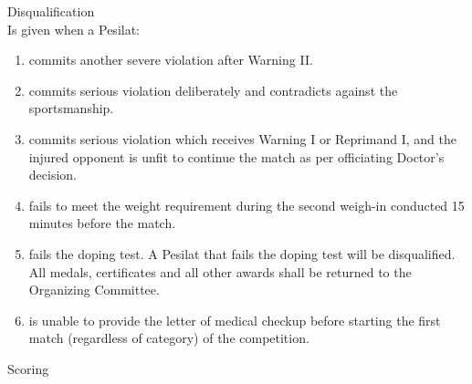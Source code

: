 \begin{legal}
\begin{legal}
\begin{legal}
\begin{legal}
            \item Disqualification \\
            Is given when a Pesilat:
                \begin{enumerate}[label=\alph*.]
                \item commits another severe violation after Warning II.
                \item commits serious violation deliberately and contradicts against the
                      sportsmanship.
                \item commits serious violation which receives Warning I or Reprimand
                      I, and the injured opponent is unfit to continue the match as per officiating
                      Doctor’s decision.
                \item fails to meet the weight requirement during the second weigh-in conducted 15
                      minutes before the match.
                \item fails the doping test. A Pesilat that fails the doping test will be
                      disqualified. All medals, certificates and all other awards shall be returned
                      to the Organizing Committee.
                \item is unable to provide the letter of medical checkup before starting the
                      first match (regardless of category) of the competition.
                \end{enumerate}
            \end{legal}


        \end{legal}

        \item Scoring\\


\end{legal}
\end{legal}
